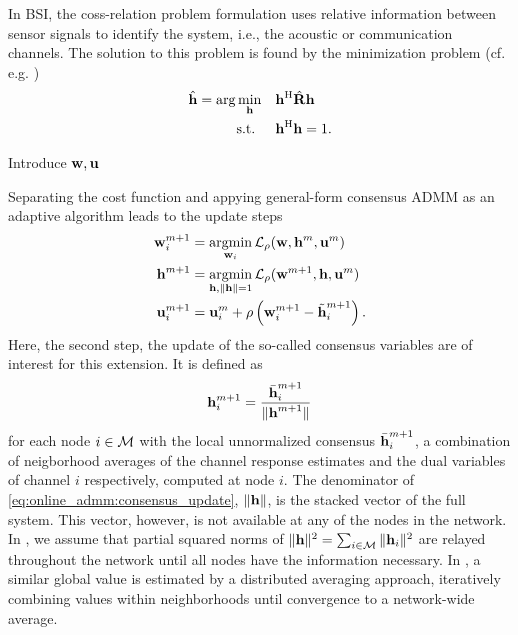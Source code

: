 \documentclass{article}
\begin{document}
In BSI, the coss-relation problem formulation uses relative information between sensor signals to identify the system, i.e., the acoustic or communication channels.
The solution to this problem is found by the minimization problem (cf. e.g. \cite{langtongBlindIdentificationEqualization1994,huangAdaptiveMultichannelLeast2002,huangClassFrequencydomainAdaptive2003})
\begin{equation}
  \begin{aligned}
      \hat{\bm{\mathrm{h}}} = \arg \min_{\bm{\mathrm{h}}} \quad &\bm{\mathrm{h}}^{\mathrm{H}} \hat{\bm{\mathrm{R}}} \bm{\mathrm{h}} \\
      \text{s.t. } \quad &\bm{\mathrm{h}}^{\mathrm{H}} \bm{\mathrm{h}} = 1.
  \end{aligned}\label{eq:frequency_domain:min_prob}
\end{equation}
\begin{todo}
  Introduce \(\bm{\mathrm{w}}, \bm{\mathrm{u}}\)
\end{todo}
Separating the cost function and appying general-form consensus ADMM as an adaptive algorithm leads to the update steps
\begin{align}
  \bm{\mathrm{w}}_i^{m+1} &= \underset{\bm{\mathrm{w}}_i}{\operatorname{argmin}} \, \mathcal{L}_{\rho} (\bm{\mathrm{w}},\bm{\mathrm{h}}^m,\bm{\mathrm{u}}^m)\label{eq:general_consensus_admm:local}\\
  \bm{\mathrm{h}}^{m+1} &= \underset{\bm{\mathrm{h}}, \|\bm{\mathrm{h}}\| = 1}{\operatorname{argmin}}\, \mathcal{L}_{\rho} (\bm{\mathrm{w}}^{m+1},\bm{\mathrm{h}},\bm{\mathrm{u}}^m)\label{eq:general_consensus_admm:global}\\
  \bm{\mathrm{u}}_i^{m+1} &= \bm{\mathrm{u}}_i^{m} + \rho \left( \bm{\mathrm{w}}_i^{m+1} - \tilde{\bm{\mathrm{h}}}_i^{m+1} \right).\label{eq:general_consensus_admm:dual}
\end{align}
Here, the second step, the update of the so-called consensus variables are of interest for this extension.
It is defined \cite{blochbergerDBSI} as
\begin{equation}
    \bm{\mathrm{h}}_i^{m+1} = \frac{\bar{\bm{\mathrm{h}}}_i^{m+1}}{\|\bm{\mathrm{h}}^{m+1}\|}\label{eq:online_admm:consensus_update}
\end{equation}
for each node \(i \in \mathcal{M}\) with the local unnormalized consensus \(\bar{\bm{\mathrm{h}}}_i^{m+1}\), a combination of neigborhood averages of the channel response estimates and the dual variables of channel \(i\) respectively, computed at node \(i\).
The denominator of \eqref{eq:online_admm:consensus_update}, \(\|\bm{\mathrm{h}}\|\), is the stacked vector of the full system. This vector, however, is not available at any of the nodes in the network.
In \cite{blochbergerDBSI}, we assume that partial squared norms of \(\|\bm{\mathrm{h}}\|^2 = \sum_{i \in \mathcal{M}} \|\bm{\mathrm{h}}_i\|^2\) are relayed throughout the network until all nodes have the information necessary.
In \cite{yuDistributedBlindSystem2014,liuDistributedBlindIdentification2016}, a similar global value is estimated by a distributed averaging approach, iteratively combining values within neighborhoods until convergence to a network-wide average.
\end{document}

